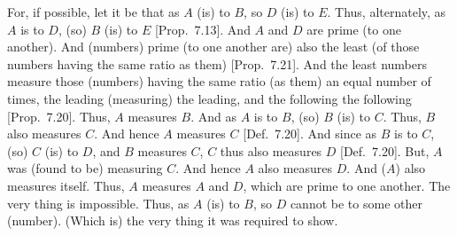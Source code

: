 \begin{Parallel}{}{}
{For, if possible, let it be that as $A$ (is) to $B$, so $D$ (is) to $E$. 
Thus, alternately, as $A$ is to $D$, (so) $B$ (is) to $E$ [Prop.~7.13]. And $A$ and $D$ are prime (to one another).  And (numbers) prime (to one another are)
also the least (of those numbers having the same ratio as them) [Prop.~7.21]. And the least numbers measure those
(numbers) having the same ratio (as them) an equal number of times,
the leading (measuring) the leading, and the following the following [Prop.~7.20]. Thus, $A$ measures $B$. And as $A$
is to $B$, (so) $B$ (is) to $C$.  Thus, $B$ also measures $C$.  And hence
$A$ measures $C$ [Def.~7.20]. And since as $B$ is to
$C$, (so) $C$ (is) to $D$, and $B$ measures $C$, $C$ thus also measures
$D$ [Def.~7.20].  But, $A$ was (found to be) measuring $C$. And 
hence $A$ also measures $D$. And ($A$) also measures itself.  Thus, $A$
measures $A$ and $D$, which are prime to one another. The very thing is impossible. Thus, as $A$ (is) to $B$, so $D$ cannot be to some other (number). (Which is) the very thing it was required to show.}
\end{Parallel}

